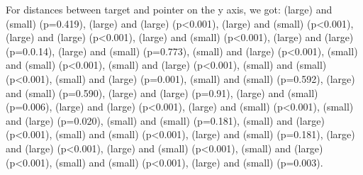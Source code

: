 For distances between target and pointer on the y axis, we got: 
\pinch(large) and \pinch(small) (p=0.419), \pinch(large) and \swipe(large) (p<0.001), \pinch(large) and \swipe(small) (p<0.001), \pinch(large) and \throw(large) (p<0.001), \pinch(large) and \throw(small) (p<0.001), \pinch(large) and \tilt(large) (p=0.0.14), \pinch(large) and \tilt(small) (p=0.773), \pinch(small) and \swipe(large) (p<0.001), \pinch(small) and \swipe(small) (p<0.001), \pinch(small) and \throw(large) (p<0.001), \pinch(small) and \throw(small) (p<0.001), \pinch(small) and \tilt(large) (p=0.001), \pinch(small) and \tilt(small) (p=0.592), \swipe(large) and \swipe(small) (p=0.590), \swipe(large) and \throw(large) (p=0.91), \swipe(large) and \throw(small) (p=0.006), \swipe(large) and \tilt(large) (p<0.001), \swipe(large) and \tilt(small) (p<0.001), \swipe(small) and \throw(large) (p=0.020), \swipe(small) and \throw(small) (p=0.181), \swipe(small) and \tilt(large) (p<0.001), \swipe(small) and \tilt(small) (p<0.001), \throw(large) and \throw(small) (p=0.181), \throw(large) and \tilt(large) (p<0.001), \throw(large) and \tilt(small) (p<0.001), \throw(small) and \tilt(large) (p<0.001), \throw(small) and \tilt(small) (p<0.001), \tilt(large) and \tilt(small) (p=0.003).